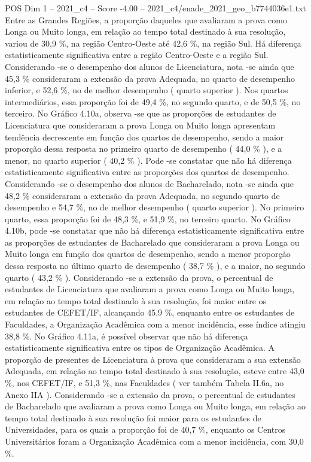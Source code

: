 \begin{textsample}{POS Dim 1 – 2021\_c4 – Score -4.00 – 2021\_c4/enade\_2021\_geo\_b7744036e1.txt}
Entre as Grandes Regiões, a proporção daqueles que avaliaram a prova como Longa ou Muito longa, em relação ao tempo total destinado à sua resolução, variou de 30,9 \%, na região Centro-Oeste até 42,6 \%, na região Sul.
Há diferença estatisticamente significativa entre a região Centro-Oeste e a região Sul.
Considerando -se o desempenho dos alunos de Licenciatura, nota -se ainda que 45,3 \% consideraram a extensão da prova Adequada, no quarto de desempenho inferior, e 52,6 \%, no de melhor desempenho ( quarto superior ).
Nos quartos intermediários, essa proporção foi de 49,4 \%, no segundo quarto, e de 50,5 \%, no terceiro.
No Gráfico 4.10a, observa -se que as proporções de estudantes de Licenciatura que consideraram a prova Longa ou Muito longa apresentam tendência decrescente em função dos quartos de desempenho, sendo a maior proporção dessa resposta no primeiro quarto de desempenho ( 44,0 \% ), e a menor, no quarto superior ( 40,2 \% ).
Pode -se constatar que não há diferença estatisticamente significativa entre as proporções dos quartos de desempenho.
Considerando -se o desempenho dos alunos de Bacharelado, nota -se ainda que 48,2 \% consideraram a extensão da prova Adequada, no segundo quarto de desempenho e 54,7 \%, no de melhor desempenho ( quarto superior ).
No primeiro quarto, essa proporção foi de 48,3 \%, e 51,9 \%, no terceiro quarto.
No Gráfico 4.10b, pode -se constatar que não há diferença estatisticamente significativa entre as proporções de estudantes de Bacharelado que consideraram a prova Longa ou Muito longa em função dos quartos de desempenho, sendo a menor proporção dessa resposta no último quarto de desempenho ( 38,7 \% ), e a maior, no segundo quarto ( 43,2 \% ).
Considerando -se a extensão da prova, o percentual de estudantes de Licenciatura que avaliaram a prova como Longa ou Muito longa, em relação ao tempo total destinado à sua resolução, foi maior entre os estudantes de CEFET/IF, alcançando 45,9 \%, enquanto entre os estudantes de Faculdades, a Organização Acadêmica com a menor incidência, esse índice atingiu 38,8 \%.
No Gráfico 4.11a, é possível observar que não há diferença estatisticamente significativa entre os tipos de Organização Acadêmica.
A proporção de presentes de Licenciatura à prova que consideraram a sua extensão Adequada, em relação ao tempo total destinado à sua resolução, esteve entre 43,0 \%, nos CEFET/IF, e 51,3 \%, nas Faculdades ( ver também Tabela II.6a, no Anexo IIA ).
Considerando -se a extensão da prova, o percentual de estudantes de Bacharelado que avaliaram a prova como Longa ou Muito longa, em relação ao tempo total destinado à sua resolução foi maior para os estudantes de Universidades, para os quais a proporção foi de 40,7 \%, enquanto os Centros Universitários foram a Organização Acadêmica com a menor incidência, com 30,0 \%.

\end{textsample}
